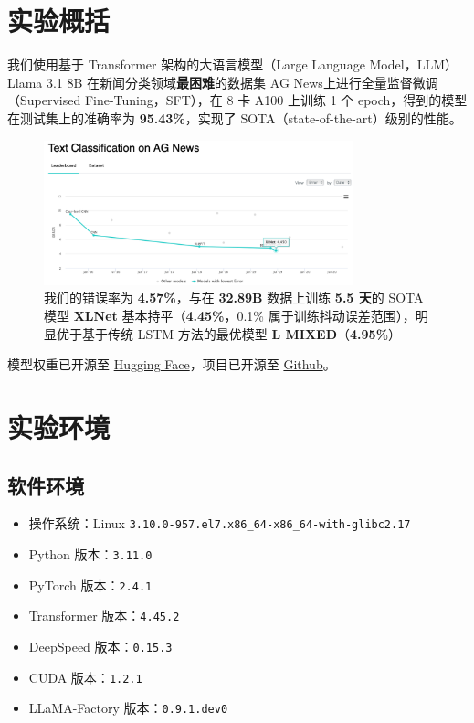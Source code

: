 \maketitle

\section{实验概括}

我们使用基于 Transformer 架构的大语言模型（Large Language Model，LLM）Llama 3.1 8B\cite{grattafiori2024llama3herdmodels} 在新闻分类领域\textbf{最困难}的数据集 AG News\cite{zhang2015character}上进行全量监督微调（Supervised Fine-Tuning，SFT），在 8 卡 A100 上训练 1 个 epoch，得到的模型在测试集上的准确率为 \textbf{95.43\%}，实现了 SOTA（state-of-the-art）级别的性能。
\begin{figure}[htbp]
    \centering
    \includegraphics[width=0.8\textwidth]{images/leaderboard.png}
    \caption{我们的错误率为 \textbf{4.57\%}，与在 \textbf{32.89B} 数据上训练 \textbf{5.5 天}的 SOTA 模型 \textbf{XLNet} 基本持平（\textbf{4.45\%}，0.1\% 属于训练抖动误差范围），明显优于基于传统 LSTM 方法的最优模型 \textbf{L MIXED}（\textbf{4.95\%}）}
\end{figure}

模型权重已开源至 \href{https://huggingface.co/Word2Li/LLaMA-3.1-8B-AGNews-SFT}{Hugging Face}，项目已开源至 \href{https://github.com/Word2VecT/LLaMA-3.1-8B-AGNews-SFT}{Github}。

\section{实验环境}

\subsection{软件环境}
\begin{itemize}
    \item 操作系统：Linux \texttt{3.10.0-957.el7.x86\_64-x86\_64-with-glibc2.17}
    \item Python 版本：\texttt{3.11.0}
    \item PyTorch 版本：\texttt{2.4.1}
    \item Transformer 版本：\texttt{4.45.2}
    \item DeepSpeed 版本：\texttt{0.15.3}
    \item CUDA 版本：\texttt{1.2.1}
    \item LLaMA-Factory 版本：\texttt{0.9.1.dev0}
\end{itemize}


